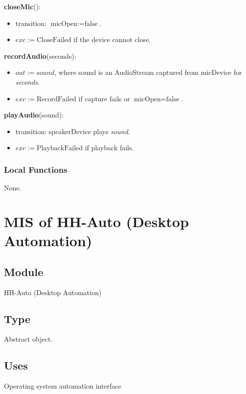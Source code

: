 \documentclass[12pt, titlepage]{article}
\begin{document}
\noindent
\textbf{closeMic}():
\begin{itemize}
  \item transition: $\text{micOpen} := \text{false}$.
  \item $exc := \text{CloseFailed}$ if the device cannot close.
\end{itemize}

\noindent
\textbf{recordAudio}(seconds):
\begin{itemize}
  \item $out := sound$, where sound is an AudioStream captured from micDevice for
  \textit{seconds}.
  \item $exc := \text{RecordFailed}$ if capture fails or $\text{micOpen} = \text{false}$.
\end{itemize}

\noindent
\textbf{playAudio}(sound):
\begin{itemize}
  \item transition: speakerDevice plays \textit{sound}.
  \item $exc := \text{PlaybackFailed}$ if playback fails.
\end{itemize}

\subsubsection{Local Functions}

None.

\section{MIS of HH-Auto (Desktop Automation)} \label{mod:HHAuto}

\subsection{Module}

HH-Auto (Desktop Automation)

\subsection{Type}

Abstract object.

\subsection{Uses}

Operating system automation interface
\end{document}
